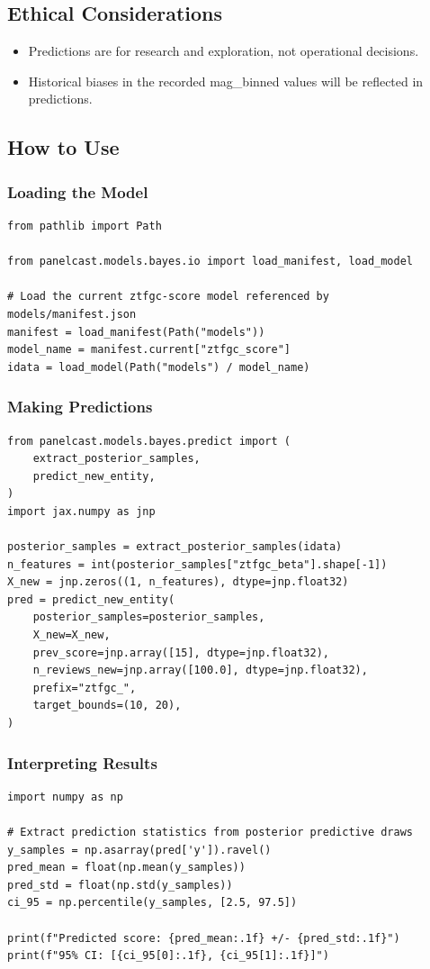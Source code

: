 \documentclass{article}
\begin{document}
\subsection*{Ethical Considerations}
\begin{itemize}
  \item Predictions are for research and exploration, not operational decisions.
  \item Historical biases in the recorded mag\_binned values will be reflected in predictions.
\end{itemize}

\subsection*{How to Use}

\subsubsection*{Loading the Model}
\begin{lstlisting}
from pathlib import Path

from panelcast.models.bayes.io import load_manifest, load_model

# Load the current ztfgc-score model referenced by models/manifest.json
manifest = load_manifest(Path("models"))
model_name = manifest.current["ztfgc_score"]
idata = load_model(Path("models") / model_name)
\end{lstlisting}

\subsubsection*{Making Predictions}
\begin{lstlisting}
from panelcast.models.bayes.predict import (
    extract_posterior_samples,
    predict_new_entity,
)
import jax.numpy as jnp

posterior_samples = extract_posterior_samples(idata)
n_features = int(posterior_samples["ztfgc_beta"].shape[-1])
X_new = jnp.zeros((1, n_features), dtype=jnp.float32)
pred = predict_new_entity(
    posterior_samples=posterior_samples,
    X_new=X_new,
    prev_score=jnp.array([15], dtype=jnp.float32),
    n_reviews_new=jnp.array([100.0], dtype=jnp.float32),
    prefix="ztfgc_",
    target_bounds=(10, 20),
)
\end{lstlisting}

\subsubsection*{Interpreting Results}
\begin{lstlisting}
import numpy as np

# Extract prediction statistics from posterior predictive draws
y_samples = np.asarray(pred['y']).ravel()
pred_mean = float(np.mean(y_samples))
pred_std = float(np.std(y_samples))
ci_95 = np.percentile(y_samples, [2.5, 97.5])

print(f"Predicted score: {pred_mean:.1f} +/- {pred_std:.1f}")
print(f"95% CI: [{ci_95[0]:.1f}, {ci_95[1]:.1f}]")
\end{lstlisting}
\end{document}
